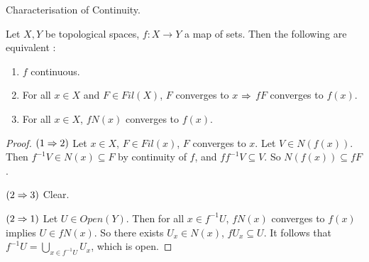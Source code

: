 \documentclass[main.tex]{subfiles}
\begin{document}
\begin{thm} Characterisation of Continuity. 
  
  Let $X, Y$ be topological spaces, $f : X \to Y$ a map of sets. 
  Then the following are equivalent : 
  \begin{enumerate}
    \item $f$ continuous. 
    \item For all $x \in X$ and $F \in Fil(X)$,
    $F$ converges to $x$ $\Rightarrow$ $fF$ converges to $f(x)$.
    \item For all $x \in X$, $fN(x)$ converges to $f(x)$.
  \end{enumerate}
\end{thm}
\begin{proof}
  $(1\Rightarrow 2)$
  Let $x \in X$, $F \in Fil(x)$, $F$ converges to $x$. 
  Let $V \in N(f(x))$.
  Then $f^{-1}V \in N(x) \subseteq F$ by continuity of $f$,
  and $f f^{-1} V \subseteq V$.
  So $N(f(x)) \subseteq f F$.

  $(2\Rightarrow 3)$ Clear. 

  $(2\Rightarrow 1)$ 
  Let $U \in Open(Y)$.
  Then for all $x \in f^{-1}U$,
  $fN(x)$ converges to $f(x)$ implies $U \in fN(x)$.
  So there exists $U_x \in N(x)$, $fU_x \subseteq U$.
  It follows that $f^{-1}U = \bigcup_{x \in f^{-1}U} U_x$, 
  which is open. 
\end{proof}
\end{document}
